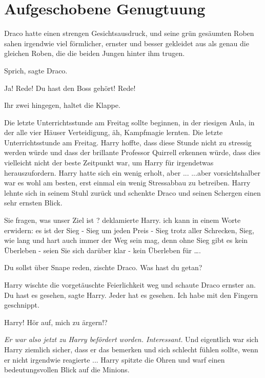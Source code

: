 \chapter{Aufgeschobene Genugtuung}

Draco hatte einen strengen Gesichtsausdruck, und seine grün
gesäumten Roben sahen irgendwie viel förmlicher, ernster und besser gekleidet
aus als genau die gleichen Roben, die die beiden Jungen hinter ihm trugen.

\glqq{}Sprich\grqq{}, sagte Draco.

\glqq{}Ja! Rede!\grqq{} \glqq{}Du hast den Boss gehört! Rede!\grqq{}

\glqq{}Ihr zwei hingegen, haltet die Klappe.\grqq{}

Die letzte Unterrichtsstunde am Freitag sollte beginnen, in der riesigen Aula,
in der alle vier Häuser Verteidigung, äh, Kampfmagie lernten. Die letzte
Unterrichtsstunde am Freitag. Harry hoffte, dass diese Stunde nicht zu stressig
werden würde und dass der brillante Professor Quirrell erkennen würde, dass dies
vielleicht nicht der beste Zeitpunkt war, um Harry für irgendetwas
herauszufordern. Harry hatte sich ein wenig erholt, aber ... ...aber
vorsichtshalber war es wohl am besten, erst einmal ein wenig Stressabbau zu
betreiben. Harry lehnte sich in seinem Stuhl zurück und schenkte Draco und
seinen Schergen einen sehr ernsten Blick.

\glqq{}Sie fragen, was unser Ziel ist ?\grqq{} deklamierte Harry. \glqq{}ich kann
in einem Worte erwidern: es ist der Sieg - Sieg um jeden Preis - Sieg trotz
aller Schrecken, Sieg, wie lang und hart auch immer der Weg sein mag, denn ohne
Sieg gibt es kein Überleben - seien Sie sich darüber klar - kein Überleben für
….\grqq{}

\glqq{}Du sollst über Snape reden\grqq{}, zischte Draco. \glqq{}Was hast du
getan?\grqq{}

Harry wischte die vorgetäuschte Feierlichkeit weg und schaute Draco ernster an.
\glqq{}Du hast es gesehen\grqq{}, sagte Harry. \glqq{}Jeder hat es gesehen. Ich
habe mit den Fingern geschnippt.\grqq{}

\glqq{}Harry! Hör auf, mich zu ärgern!?\grqq{}

\emph{Er war also jetzt zu Harry befördert worden. Interessant.} Und eigentlich
war sich Harry ziemlich sicher, dass er das bemerken und sich schlecht fühlen
sollte, wenn er nicht irgendwie reagierte ... Harry spitzte die Ohren und warf
einen bedeutungsvollen Blick auf die Minions.

